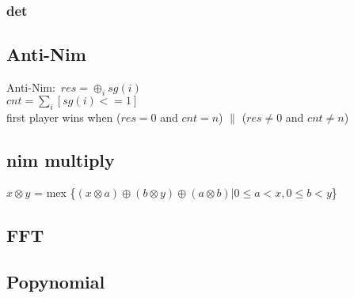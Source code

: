 \documentclass[a4paper,5pt,twocolumn,titlepage]{article}
\begin{document}
\begin{CJK*}{GBK}{song}
        \subsubsection{det}
            
       \subsection{Anti-Nim}
       Anti-Nim:\
    $res = \oplus _{i} sg(i)$ \\
    $cnt  = \sum_{i} [sg(i) <= 1]$\\
    first player wins when ($res = 0$ and $cnt = n$) $\parallel$ ($res \neq 0$ and $ cnt \neq n$)
       \subsection{nim multiply}
        $x \otimes y$ = mex \{$(x \otimes a) \oplus (b \otimes y) \oplus (a \otimes b)|0 \leq a < x, 0 \leq b < y$\}
        
    \subsection{FFT}
        
    \subsection{Popynomial}
        
\end{CJK*}
\end{document}
